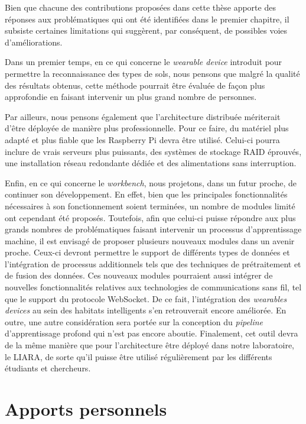 Bien que chacune des contributions proposées dans cette thèse apporte des réponses aux problématiques qui ont été identifiées dans le premier chapitre, il subsiste certaines limitations qui suggèrent, par conséquent, de possibles voies d'améliorations.

Dans un premier temps, en ce qui concerne le \textit{wearable device} introduit pour permettre la reconnaissance des types de sols, nous pensons que malgré la qualité des résultats obtenus, cette méthode pourrait être évaluée de façon plus approfondie en faisant intervenir un plus grand nombre de personnes.

Par ailleurs, nous pensons également que l'architecture distribuée mériterait d'être déployée de manière plus professionnelle. Pour ce faire, du matériel plus adapté et plus fiable que les Raspberry Pi devra être utilisé. Celui-ci pourra inclure de vrais serveurs plus puissants, des systèmes de stockage \acs{RAID} éprouvés, une installation réseau redondante dédiée et des alimentations sans interruption.

Enfin, en ce qui concerne le \textit{workbench}, nous projetons, dans un futur proche, de continuer son développement. En effet, bien que les principales fonctionnalités nécessaires à son fonctionnement soient terminées, un nombre de modules limité ont cependant été proposés. Toutefois, afin que celui-ci puisse répondre aux plus grands nombres de problématiques faisant intervenir un processus d'apprentissage machine, il est envisagé de proposer plusieurs nouveaux modules dans un avenir proche. Ceux-ci devront permettre le support de différents types de données et l'intégration de processus additionnels tels que des techniques de prétraitement et de fusion des données. Ces nouveaux modules pourraient aussi intégrer de nouvelles fonctionnalités relatives aux technologies de communications sans fil, tel que le support du protocole WebSocket. De ce fait, l'intégration des \textit{wearables devices} au sein des habitats intelligents s'en retrouverait encore améliorée. En outre, une autre considération sera portée sur la conception du \textit{pipeline} d'apprentissage profond qui n'est pas encore aboutie. Finalement, cet outil devra de la même manière que pour l'architecture être déployé dans notre laboratoire, le \acs{LIARA}, de sorte qu'il puisse être utilisé régulièrement par les différents étudiants et chercheurs.

\section{Apports personnels}

